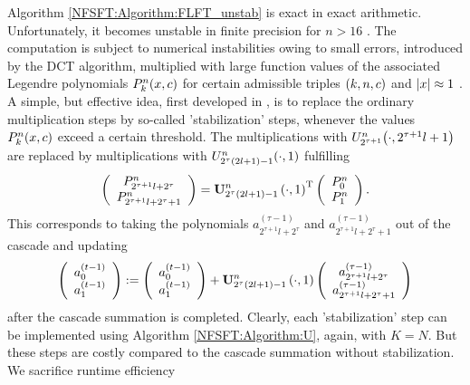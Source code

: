 Algorithm \ref{NFSFT:Algorithm:FLFT_unstab} is exact in exact arithmetic. Unfortunately, it becomes unstable in finite precision for $n > 16$ \cite{postta97}. The computation is subject to numerical instabilities owing to small errors, introduced by the DCT algorithm, multiplied with large function values of the associated Legendre polynomials $P_{k}^n{\hspace{-0.4ex}}\left(x,c\right)$ for certain admissible triples $\left(k,n,c\right)$ and $\left\vert x\right\vert \approx 1$ \cite{kupo02}. A simple, but effective idea, first developed in \cite{postta97}, is to replace the ordinary multiplication steps by so-called 'stabilization' steps, whenever the values $P_{k}^n{\hspace{-0.4ex}}\left(x,c\right)$ exceed a certain threshold. The multiplications with $U_{2^{\tau+1}}^n{\hspace{-0.4ex}}\left(\cdot,2^{\tau+1}l+1\right)$ are replaced by multiplications with $U_{2^{\tau}(2l+1)-1}^n{\hspace{-0.4ex}}\left(\cdot,1\right)$ fulfilling
\[
	\left(\begin{array}{c}
	  P_{2^{\tau+1}l+2^{\tau}}^{n}\\ 
	  P_{2^{\tau+1}l+2^{\tau}+1}^{n}
	\end{array}\right)
	=
	\mathbf{U}_{2^{\tau}(2l+1)-1}^{n}\left(\cdot,1\right)^{\text{\rm{T}}}
		\left(\begin{array}{c}
	  P_{0}^{n}\\
	  P_{1}^{n}
	\end{array}\right).
\]
This corresponds to taking the polynomials $a_{2^{\tau+1}l+2^{\tau}}^{(\tau-1)}$ and $a_{2^{\tau+1}l+2^{\tau}+1}^{(\tau-1)}$ out of the cascade and updating
\begin{equation}
  \label{NFSFT:StabilizationStep}
	\left(\begin{array}{c}
	  a_{0}^{(t-1)}\\
	  a_{1}^{(t-1)}
	\end{array}\right)
	:=
	\left(\begin{array}{c}
	  a_{0}^{(t-1)}\\
	  a_{1}^{(t-1)}
	\end{array}\right)
  +
	\mathbf{U}_{2^{\tau}(2l+1)-1}^{n}\left(\cdot,1\right)
	\left(\begin{array}{c}
	  a_{2^{\tau+1}l+2^{\tau}}^{(\tau-1)}\\
	  a_{2^{\tau+1}l+2^{\tau}+1}^{(\tau-1)}
	\end{array}\right)  
\end{equation}
\label{DSFT:Stabilization}
after the cascade summation is completed. Clearly, each 'stabilization' step can be implemented using Algorithm \ref{NFSFT:Algorithm:U}, 
again, with $K = N$. But these steps are costly compared to the cascade summation without stabilization. We sacrifice runtime efficiency 
